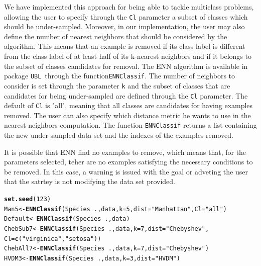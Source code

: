 \documentclass[10pt,a4paper]{article}\usepackage[]{graphicx}\usepackage[]{color}
\makeatletter
\newcommand{\hlnum}[1]{\textcolor[rgb]{0.686,0.059,0.569}{#1}}%
\newcommand{\hlstr}[1]{\textcolor[rgb]{0.192,0.494,0.8}{#1}}%
\newcommand{\hlopt}[1]{\textcolor[rgb]{0,0,0}{#1}}%
\newcommand{\hlstd}[1]{\textcolor[rgb]{0.345,0.345,0.345}{#1}}%
\newcommand{\hlkwb}[1]{\textcolor[rgb]{0.69,0.353,0.396}{#1}}%
\newcommand{\hlkwc}[1]{\textcolor[rgb]{0.333,0.667,0.333}{#1}}%
\newcommand{\hlkwd}[1]{\textcolor[rgb]{0.737,0.353,0.396}{\textbf{#1}}}%
\newenvironment{kframe}{%
 \def\at@end@of@kframe{}%
 \ifinner\ifhmode%
  \def\at@end@of@kframe{\end{minipage}}%
  \begin{minipage}{\columnwidth}%
 \fi\fi%
 \def\FrameCommand##1{\hskip\@totalleftmargin \hskip-\fboxsep
 \colorbox{shadecolor}{##1}\hskip-\fboxsep
     \hskip-\linewidth \hskip-\@totalleftmargin \hskip\columnwidth}%
 \MakeFramed {\advance\hsize-\width
   \@totalleftmargin\z@ \linewidth\hsize
   \@setminipage}}%
 {\par\unskip\endMakeFramed%
 \at@end@of@kframe}
\newenvironment{knitrout}{}{} %
\newcommand{\UBL}{package \texttt{UBL}\ }
\makeatother
\begin{document}
We have implemented this approach for being able to tackle multiclass problems, allowing the user to specify through the \texttt{Cl} parameter a subset of classes which should be under-sampled. Moreover, in our implementation, the user may also define the number of nearest neighbors that should be considered by the algorithm. This means that an example is removed if its class label is different from the class label of at least half of its k-nearest neighbors and if it belongs to the subset of classes candidates for removal. The ENN algorithm is available in \UBL through the function\texttt{ENNClassif}. The number of neighbors to consider is set through the parameter \texttt{k} and the subset of classes that are candidates for being under-sampled are defined through the \texttt{Cl} parameter. The default of \texttt{Cl} is "all", meaning that all classes are candidates for having examples removed. The user can also specify which distance metric he wants to use in the nearest neighbors computation. The function \texttt{ENNClassif} returns a list containing the new under-sampled data set and the indexes of the examples removed.

It is possible that ENN find no examples to remove, which means that, for the parameters selected, teher are no examples satisfying the necessary conditions to be removed. In this case, a warning is issued with the goal or adveting the user that the satrtey is not modifying the data set provided.


\begin{knitrout}\footnotesize
{}\color{fgcolor}\begin{kframe}
\begin{alltt}
  \hlkwd{set.seed}\hlstd{(}\hlnum{123}\hlstd{)}
  \hlstd{Man5} \hlkwb{<-} \hlkwd{ENNClassif}\hlstd{(Species}\hlopt{~}\hlstd{., data,} \hlkwc{k}\hlstd{=}\hlnum{5}\hlstd{,} \hlkwc{dist}\hlstd{=}\hlstr{"Manhattan"}\hlstd{,} \hlkwc{Cl}\hlstd{=}\hlstr{"all"}\hlstd{)}
  \hlstd{Default} \hlkwb{<-} \hlkwd{ENNClassif}\hlstd{(Species}\hlopt{~}\hlstd{., data)}
  \hlstd{ChebSub7} \hlkwb{<-} \hlkwd{ENNClassif}\hlstd{(Species}\hlopt{~}\hlstd{., data,} \hlkwc{k}\hlstd{=}\hlnum{7}\hlstd{,} \hlkwc{dist}\hlstd{=}\hlstr{"Chebyshev"}\hlstd{,}
                         \hlkwc{Cl}\hlstd{=}\hlkwd{c}\hlstd{(}\hlstr{"virginica"}\hlstd{,} \hlstr{"setosa"}\hlstd{))}
  \hlstd{ChebAll7} \hlkwb{<-} \hlkwd{ENNClassif}\hlstd{(Species}\hlopt{~}\hlstd{., data,} \hlkwc{k}\hlstd{=}\hlnum{7}\hlstd{,} \hlkwc{dist}\hlstd{=}\hlstr{"Chebyshev"}\hlstd{)}
  \hlstd{HVDM3} \hlkwb{<-} \hlkwd{ENNClassif}\hlstd{(Species}\hlopt{~}\hlstd{., data,} \hlkwc{k}\hlstd{=}\hlnum{3}\hlstd{,} \hlkwc{dist}\hlstd{=}\hlstr{"HVDM"}\hlstd{)}
\end{alltt}
\end{kframe}
\end{knitrout}
\end{document}
